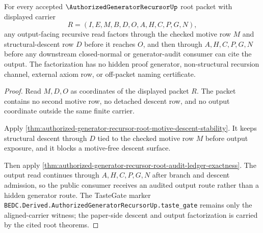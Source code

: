 \begin{theorem}
\label{thm:authorized-generator-recursor-root-descent-output-factorization}
For every accepted $\AuthorizedGeneratorRecursorUp$ root packet with displayed carrier
$$
R=(I,E,M,B,D,O,A,H,C,P,G,N),
$$
any output-facing recursive read factors through the checked motive row $M$ and structural-descent row $D$ before it reaches $O$, and then through $A,H,C,P,G,N$ before any downstream closed-normal or generator-audit consumer can cite the output. The factorization has no hidden proof generator, non-structural recursion channel, external axiom row, or off-packet naming certificate.
\end{theorem}
\begin{proof}
Read $M,D,O$ as coordinates of the displayed packet $R$. The packet contains no second motive row, no detached descent row, and no output coordinate outside the same finite carrier.

Apply \autoref{thm:authorized-generator-recursor-root-motive-descent-stability}. It keeps structural descent through $D$ tied to the checked motive row $M$ before output exposure, and it blocks a motive-free descent surface.

Then apply \autoref{thm:authorized-generator-recursor-root-audit-ledger-exactness}. The output read continues through $A,H,C,P,G,N$ after branch and descent admission, so the public consumer receives an audited output route rather than a hidden generator route. The TasteGate marker \texttt{BEDC.Derived.AuthorizedGeneratorRecursorUp.taste\_gate} remains only the aligned-carrier witness; the paper-side descent and output factorization is carried by the cited root theorems.
\end{proof}


